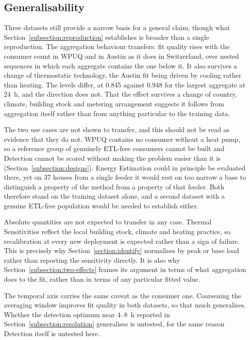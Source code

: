 \documentclass[9pt,journal,a4]{IEEEtran}
\begin{document}
\subsection{Generalisability}
\label{subsection:generalisability}

Three datasets still provide a narrow basis for a general claim, though what Section~\ref{subsection:reproduction} establishes is broader than a single reproduction. The aggregation behaviour transfers: fit quality rises with the consumer count in WPUQ and in Austin as it does in Switzerland, over nested sequences in which each aggregate contains the one below it. It also survives a change of thermostatic technology, the Austin fit being driven by cooling rather than heating. The levels differ, at 0.845 against 0.948 for the largest aggregate at 24~h, and the direction does not. That the effect survives a change of country, climate, building stock and metering arrangement suggests it follows from aggregation itself rather than from anything particular to the training data.

The two use cases are not shown to transfer, and this should not be read as evidence that they do not. WPUQ contains no consumer without a heat pump, so a reference group of genuinely ETL-free consumers cannot be built and Detection cannot be scored without making the problem easier than it is (Section~\ref{subsection:designs}). Energy Estimation could in principle be evaluated there, yet on 37 houses from a single feeder it would rest on too narrow a base to distinguish a property of the method from a property of that feeder. Both therefore stand on the training dataset alone, and a second dataset with a genuine ETL-free population would be needed to establish either.

Absolute quantities are not expected to transfer in any case. Thermal Sensitivities reflect the local building stock, climate and heating practice, so recalibration at every new deployment is expected rather than a sign of failure. This is precisely why Section~\ref{section:identify} normalises by peak or base load rather than reporting the sensitivity directly. It is also why Section~\ref{subsection:two-effects} frames its argument in terms of what aggregation does to the fit, rather than in terms of any particular fitted value.

The temporal axis carries the same caveat as the consumer one. Coarsening the averaging window improves fit quality in both datasets, so that much generalises. Whether the detection optimum near 4--8~h reported in Section~\ref{subsection:resolution} generalises is untested, for the same reason Detection itself is untested here.
\end{document}
